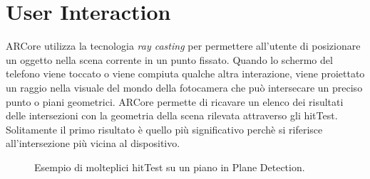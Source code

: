 \documentclass[crop=false, class=book]{standalone}
\begin{document}
	\chapter{User Interaction}
	ARCore utilizza la tecnologia \textit{ray casting} per permettere all'utente di posizionare un oggetto nella scena corrente in un punto fissato. Quando lo schermo del telefono viene toccato o viene compiuta qualche altra interazione, viene proiettato un raggio nella visuale del mondo della fotocamera che può intersecare un preciso punto o piani geometrici. ARCore permette di ricavare un elenco dei risultati delle intersezioni con la geometria della scena rilevata attraverso gli hitTest. Solitamente il primo risultato è quello più significativo perchè si riferisce all'intersezione più vicina al dispositivo.
	
	\begin{figure}[h]
			\centering
			  \qquad
			 \qquad
			\caption{Esempio di molteplici hitTest su un piano in Plane Detection.}
			\label{fig:pet_img}
	\end{figure}
	
\end{document}
